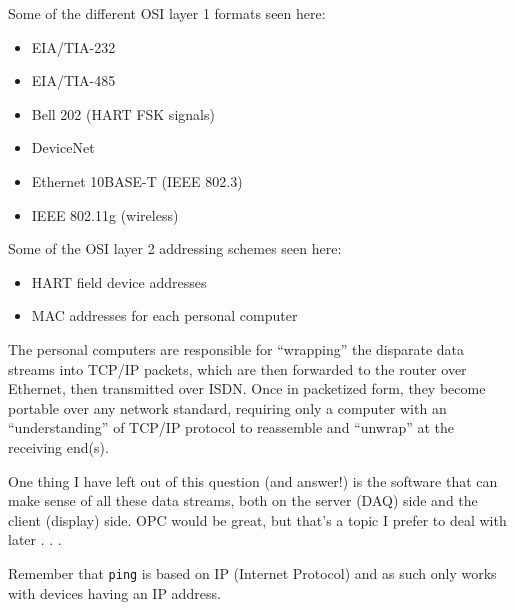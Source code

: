 





Some of the different OSI layer 1 formats seen here:

\begin{itemize}
\item{} EIA/TIA-232
\item{} EIA/TIA-485
\item{} Bell 202 (HART FSK signals)
\item{} DeviceNet
\item{} Ethernet 10BASE-T (IEEE 802.3)
\item{} IEEE 802.11g (wireless)
\end{itemize}

\vskip 10pt

Some of the OSI layer 2 addressing schemes seen here:

\begin{itemize}
\item{} HART field device addresses
\item{} MAC addresses for each personal computer
\end{itemize}

\vskip 10pt

The personal computers are responsible for ``wrapping'' the disparate data streams into TCP/IP packets, which are then forwarded to the router over Ethernet, then transmitted over ISDN.  Once in packetized form, they become portable over any network standard, requiring only a computer with an ``understanding'' of TCP/IP protocol to reassemble and ``unwrap'' at the receiving end(s).







One thing I have left out of this question (and answer!) is the software that can make sense of all these data streams, both on the server (DAQ) side and the client (display) side.  OPC would be great, but that's a topic I prefer to deal with later . . .

\vskip 10pt

Remember that {\tt ping} is based on IP (Internet Protocol) and as such only works with devices having an IP address.










